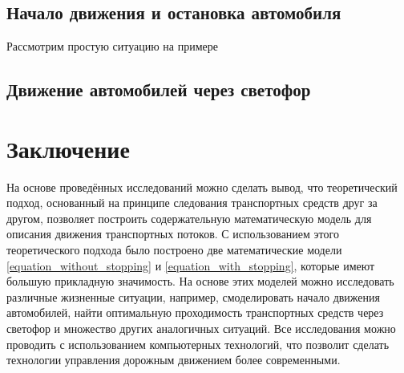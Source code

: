 \documentclass[12pt, a4paper]{extarticle}
\numberwithin{equation}{section}
\begin{document}
\subsection{Начало движения и остановка автомобиля}
Рассмотрим простую ситуацию на примере

\subsection{Движение автомобилей через светофор}
 



\vspace{\baselineskip} \vspace{\baselineskip} \vspace{\baselineskip} 
\vspace{\baselineskip} \vspace{\baselineskip} \vspace{\baselineskip}
\hspace{0pt}

\newpage
\section*{Заключение}
На основе проведённых исследований можно сделать вывод, что теоретический подход, основанный на принципе следования транспортных средств друг за другом, позволяет построить содержательную математическую модель для описания движения транспортных потоков. С использованием этого теоретического подхода было построено две математические модели  \eqref{equation_without_stopping} и \eqref{equation_with_stopping}, которые имеют большую прикладную значимость. На основе этих моделей можно исследовать различные жизненные ситуации, например, смоделировать начало движения автомобилей, найти оптимальную проходимость транспортных средств через светофор и множество других аналогичных ситуаций. Все исследования можно проводить с использованием компьютерных технологий, что позволит сделать технологии управления дорожным движением более современными.

\newpage
\end{document}
